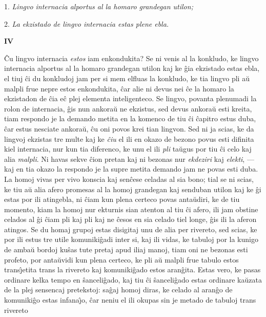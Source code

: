 1. \emph{Lingvo internacia alportus al la homaro grandegan utilon;}

2. \emph{La ekzistado de lingvo internacia estas plene ebla.}

\newpage

\begin{center}
\textbf{IV}
\end{center}

   \^Cu lingvo internacia {\sl estos} iam enkondukita? Se ni venis al la
konkludo, ke lingvo internacia alportus al la homaro grandegan
utilon kaj ke \^gia ekzistado estas ebla, el tiuj \^ci du konkludoj
jam per si mem elfluas la konkludo, ke tia lingvo pli a\u u malpli
frue nepre estos enkondukita, \^car alie ni devus nei \^ce la homaro
la ekzistadon de \^cia e\^c plej elementa inteligenteco. Se lingvo,
povanta plenumadi la rolon de internacia, \^gis nun ankora\u u ne
ekzistus, sed devus ankora\u u esti kreita, tiam respondo je la
demando metita en la komenco de tiu \^ci \^capitro estus duba, \^car
estus nesciate ankora\u u, \^cu oni povos krei tian lingvon. Sed ni
ja scias, ke da lingvoj ekzistas tre multe kaj ke {\sl \^ciu} el ili
en okazo de bezono povus esti difinita kiel internacia, nur kun tia
diferenco, ke unu el ili {\sl pli} ta\u ugus por tiu \^ci celo kaj
alia {\sl malpli}. Ni havas sekve \^cion pretan kaj ni bezonas nur
{\sl ekdeziri} kaj {\sl elekti}, --- kaj en tia okazo la respondo je
la supre metita demando jam ne povas esti duba. La homoj vivas per
vivo konscia kaj sen\^cese celadas al sia bono; tial se ni scias, ke
tiu a\u u alia afero promesas al la homoj grandegan kaj senduban
utilon kaj ke \^gi estas por ili atingebla, ni \^ciam kun plena
certeco povas anta\u udiri, ke de tiu momento, kiam la homoj nur
ekturnis sian atenton al tiu \^ci afero, ili jam obstine celados al
\^gi \^ciam pli kaj pli kaj ne \^cesos en sia celado tiel longe,
\^gis ili la aferon atingos. Se du homaj grupoj estas disigitaj unu
de alia per rivereto, sed scias, ke por ili estus tre utile
komuniki\^gadi inter si, kaj ili vidas, ke tabuloj por la kunigo de
amba\u u bordoj ku\^sas tute pretaj apud iliaj manoj, tiam oni ne
bezonas esti profeto, por anta\u uvidi kun plena certeco, ke pli a\u
u malpli frue tabulo estos trans\^{\j}etita trans la rivereto kaj
komuniki\^gado estos aran\^gita. Estas vero, ke pasas ordinare kelka
tempo en \^sanceli\^gado, kaj tiu \^ci \^sanceli\^gado estas
ordinare ka\u uzata de la plej sensencaj pretekstoj: sa\^gaj homoj
diras, ke celado al aran\^go de komuniki\^go estas infana\^{\j}o,
\^car neniu el ili okupas sin je metado de tabuloj trans rivereto
